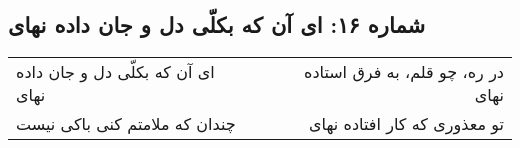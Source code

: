 \begin{center}
\section*{شماره ۱۶: ای آن که بکلّی دل و جان داده نهای}
\label{sec:016}
\begin{longtable}{l p{0.5cm} r}
ای آن که بکلّی دل و جان داده نهای
&&
در ره، چو قلم، به فرق استاده نهای
\\
چندان که ملامتم کنی باکی نیست
&&
تو معذوری که کار افتاده نهای
\\
\end{longtable}
\end{center}
